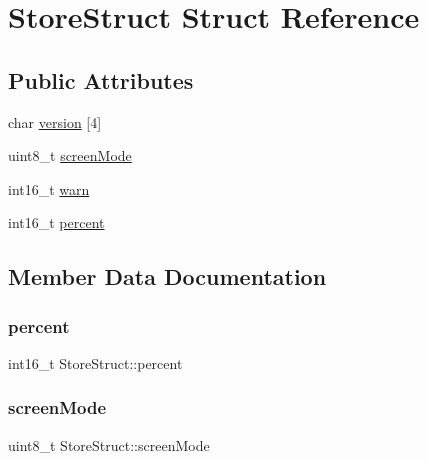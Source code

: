 \hypertarget{struct_store_struct}{}\section{Store\+Struct Struct Reference}
\label{struct_store_struct}
\subsection*{Public Attributes}
\begin{DoxyCompactItemize}
\item 
char \hyperlink{struct_store_struct_a3b2720e0397f7e122242673c3fa49899}{version} \mbox{[}4\mbox{]}
\item 
uint8\+\_\+t \hyperlink{struct_store_struct_a7825cf4843fb34ddffa4b7591479647c}{screen\+Mode}
\item 
int16\+\_\+t \hyperlink{struct_store_struct_a93d497d95b3d32461b72e9140bbc37e2}{warn}
\item 
int16\+\_\+t \hyperlink{struct_store_struct_afc8e0dba6c3f2513873b89184a6ede3a}{percent}
\end{DoxyCompactItemize}


\subsection{Member Data Documentation}
\hypertarget{struct_store_struct_afc8e0dba6c3f2513873b89184a6ede3a}{}\label{struct_store_struct_afc8e0dba6c3f2513873b89184a6ede3a} 
\subsubsection{\texorpdfstring{percent}{percent}}
{\footnotesize\ttfamily int16\+\_\+t Store\+Struct\+::percent}

\hypertarget{struct_store_struct_a7825cf4843fb34ddffa4b7591479647c}{}\label{struct_store_struct_a7825cf4843fb34ddffa4b7591479647c} 
\subsubsection{\texorpdfstring{screen\+Mode}{screenMode}}
{\footnotesize\ttfamily uint8\+\_\+t Store\+Struct\+::screen\+Mode}

\hypertarget{struct_store_struct_a3b2720e0397f7e122242673c3fa49899}{}\label{struct_store_struct_a3b2720e0397f7e122242673c3fa49899} 
